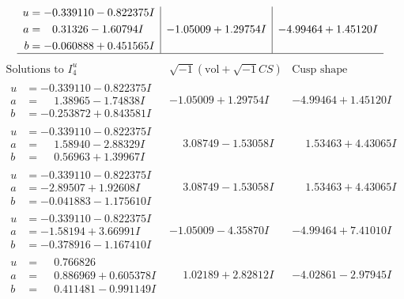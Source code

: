 \documentclass[1p]{elsarticle_modified}
\theoremstyle{definition}
\newcommand{\I}{\sqrt{-1}}
\begin{document}
$$\begin{array}{c|c|c}
\begin{aligned}
u &= -0.339110 - 0.822375 I \\
a &= \phantom{-}0.31326 - 1.60794 I \\
b &= -0.060888 + 0.451565 I\end{aligned}
 & -1.05009 + 1.29754 I & -4.99464 + 1.45120 I\\
 \hline 
 \end{array}$$\newpage$$\begin{array}{c|c|c}  
\text{Solutions to }I^u_{4}& \I (\text{vol} + \sqrt{-1}CS) & \text{Cusp shape}\\
 \hline 
\begin{aligned}
u &= -0.339110 - 0.822375 I \\
a &= \phantom{-}1.38965 - 1.74838 I \\
b &= -0.253872 + 0.843581 I\end{aligned}
 & -1.05009 + 1.29754 I & -4.99464 + 1.45120 I \\ \hline\begin{aligned}
u &= -0.339110 - 0.822375 I \\
a &= \phantom{-}1.58940 - 2.88329 I \\
b &= \phantom{-}0.56963 + 1.39967 I\end{aligned}
 & \phantom{-}3.08749 - 1.53058 I & \phantom{-}1.53463 + 4.43065 I \\ \hline\begin{aligned}
u &= -0.339110 - 0.822375 I \\
a &= -2.89507 + 1.92608 I \\
b &= -0.041883 - 1.175610 I\end{aligned}
 & \phantom{-}3.08749 - 1.53058 I & \phantom{-}1.53463 + 4.43065 I \\ \hline\begin{aligned}
u &= -0.339110 - 0.822375 I \\
a &= -1.58194 + 3.66991 I \\
b &= -0.378916 - 1.167410 I\end{aligned}
 & -1.05009 - 4.35870 I & -4.99464 + 7.41010 I \\ \hline\begin{aligned}
u &= \phantom{-}0.766826\phantom{ +0.000000I} \\
a &= \phantom{-}0.886969 + 0.605378 I \\
b &= \phantom{-}0.411481 - 0.991149 I\end{aligned}
 & \phantom{-}1.02189 + 2.82812 I & -4.02861 - 2.97945 I \\ \hline\begin{aligned}

\end{aligned}
\end{array}$$
\end{document}
